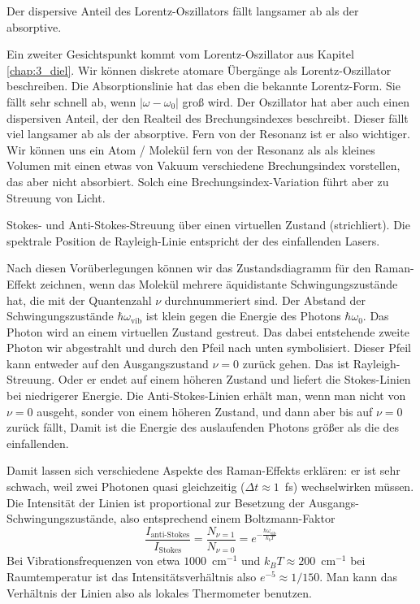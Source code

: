 \begin{marginfigure}
\caption{Der dispersive Anteil des Lorentz-Oszillators fällt langsamer ab als der absorptive. }
\end{marginfigure}
 

Ein zweiter Gesichtspunkt kommt vom Lorentz-Oszillator aus Kapitel \ref{chap:3_diel}. Wir können diskrete atomare Übergänge als Lorentz-Oszillator beschreiben. Die Absorptionslinie hat das eben die bekannte Lorentz-Form. Sie fällt sehr schnell ab, wenn $| \omega  - \omega_0 |$ groß wird. Der Oszillator hat aber auch einen dispersiven Anteil, der den Realteil des Brechungsindexes beschreibt. Dieser fällt viel langsamer ab als der absorptive. Fern von der Resonanz ist er also wichtiger. Wir können uns ein Atom / Molekül fern von der Resonanz als als kleines Volumen mit einen etwas von Vakuum verschiedene Brechungsindex vorstellen, das aber nicht absorbiert. Solch eine Brechungsindex-Variation führt aber zu Streuung von Licht.

\begin{marginfigure}%
\caption{Stokes- und Anti-Stokes-Streuung über einen virtuellen Zustand (strichliert). Die spektrale Position de Rayleigh-Linie entspricht der des einfallenden Lasers.}
\end{marginfigure}
 

Nach diesen Vorüberlegungen können wir das Zustandsdiagramm für den Raman-Effekt zeichnen, wenn das Molekül mehrere äquidistante Schwingungszustände hat, die mit der Quantenzahl $\nu$ durchnummeriert sind. Der Abstand der Schwingungszustände $\hbar \omega_\text{vib}$ ist klein gegen die Energie des Photons $\hbar \omega_0$. Das Photon wird an einem virtuellen Zustand gestreut. Das dabei entstehende zweite Photon wir abgestrahlt und durch den Pfeil nach unten symbolisiert. Dieser Pfeil kann entweder auf den Ausgangszustand $\nu = 0$ zurück gehen. Das ist Rayleigh-Streuung. Oder er endet auf einem höheren Zustand und liefert die Stokes-Linien bei niedrigerer Energie. Die Anti-Stokes-Linien erhält man, wenn man nicht von $\nu = 0$ ausgeht, sonder von einem höheren Zustand, und dann aber bis auf $\nu = 0$ zurück fällt, Damit ist die Energie des auslaufenden Photons größer als die des einfallenden.



Damit lassen sich verschiedene Aspekte des Raman-Effekts erklären: er ist sehr schwach, weil zwei Photonen quasi gleichzeitig ($\Delta t \approx 1$~fs) wechselwirken müssen. Die Intensität der Linien ist proportional zur Besetzung der Ausgangs-Schwingungszustände, also entsprechend einem Boltzmann-Faktor
\begin{equation}
\frac{I_\text{anti-Stokes}}{I_\text{Stokes}} = 
\frac{N_{\nu = 1}}{N_{\nu = 0}} =
 e^{- \frac{\hbar \omega_\text{vib}}{k_b T}}
\end{equation}
Bei Vibrationsfrequenzen von etwa $1000$~cm$^{-1}$ und $k_B T \approx 200 $~cm$^{-1}$ bei Raumtemperatur ist das Intensitätsverhältnis also $e^{-5} \approx 1 /150$. Man kann das Verhältnis der Linien also als lokales Thermometer benutzen.

